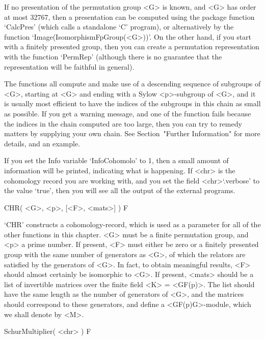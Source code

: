 If no presentation of the permutation group <G> is known, and <G> has
order at most 32767, then a presentation can be computed using the
package function `CalcPres' (which calls a standalone `C' program), or
alternatively by the {\GAP} function `Image(IsomorphismFpGroup(<G>))'.
On the other hand, if you start with a finitely
presented group, then you can create a permutation representation
with the function `PermRep' (although there is no guarantee that the
representation will be faithful in general).

The functions all compute and make use of a descending sequence of subgroups
of <G>, starting at <G> and ending with a Sylow <p>-subgroup of <G>, and
it is usually most efficient to have the indices of the subgroups in this
chain as small as possible. If you get a warning message, and one of
the function fails because the indices in the chain computed are too large,
then you can try to remedy matters by supplying your own chain. See
Section~"Further Information" for more details, and an example.

If you set the Info variable `InfoCohomolo' to 1,
then a small amount of information will be printed, indicating what is
happening. If <chr> is the cohomology record you are working with, and
you set the field <chr>`.verbose' to the value `true', then you will
see all the output of the external programs.


\>CHR( <G>, <p>, [<F>, <mats>] ) F

`CHR'  constructs  a  cohomology-record, which is used as a parameter for
all of the other functions in this chapter. <G> must be  a finite
permutation group, and <p> a prime number. If present, <F> must either be
zero or a finitely presented group with the same number of generators as
<G>, of which the relators are satisfied by the generators of <G>.
In fact, to obtain meaningful results, <F> should almost certainly be
isomorphic to <G>. If present, <mats> should be a list of invertible matrices
over the finite field <K> = <GF(p)>. The list should have the same length as the
number of generators of <G>, and the matrices should correspond to these
generators, and define a <GF(p)G>-module, which we shall denote by <M>.


\>SchurMultiplier( <chr> ) F

